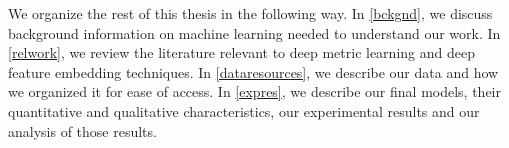 We organize the rest of this thesis in the following way. In \cref{bckgnd},  we discuss background information on machine learning needed to understand our work. In \cref{relwork}, we review the literature relevant to deep metric learning and deep feature embedding techniques. In \cref{dataresources}, we describe our data and how we organized it for ease of access. In \cref{expres}, we describe our final models, their quantitative and qualitative characteristics, our experimental results and our analysis of those results. 
